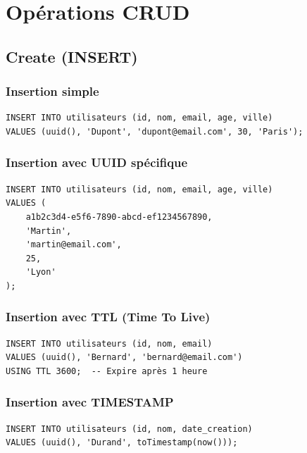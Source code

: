 \documentclass[11pt,a4paper]{article}
\begin{document}
\newpage

\section{Opérations CRUD}

\subsection{Create (INSERT)}

\subsubsection{Insertion simple}

\begin{lstlisting}
INSERT INTO utilisateurs (id, nom, email, age, ville)
VALUES (uuid(), 'Dupont', 'dupont@email.com', 30, 'Paris');
\end{lstlisting}

\subsubsection{Insertion avec UUID spécifique}

\begin{lstlisting}
INSERT INTO utilisateurs (id, nom, email, age, ville)
VALUES (
    a1b2c3d4-e5f6-7890-abcd-ef1234567890,
    'Martin',
    'martin@email.com',
    25,
    'Lyon'
);
\end{lstlisting}

\subsubsection{Insertion avec TTL (Time To Live)}

\begin{lstlisting}
INSERT INTO utilisateurs (id, nom, email)
VALUES (uuid(), 'Bernard', 'bernard@email.com')
USING TTL 3600;  -- Expire après 1 heure
\end{lstlisting}

\subsubsection{Insertion avec TIMESTAMP}

\begin{lstlisting}
INSERT INTO utilisateurs (id, nom, date_creation)
VALUES (uuid(), 'Durand', toTimestamp(now()));
\end{lstlisting}
\end{document}
